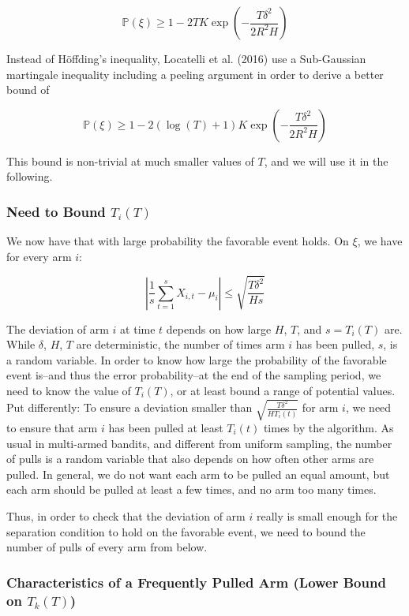 \documentclass[11pt,]{article}
\begin{document}
\[
\mathbb{P}(\xi) \geq 1 - 2TK \exp(-\frac{T\delta^2}{2R^2H})
\]

Instead of Höffding's inequality, Locatelli et al. (2016) use a
Sub-Gaussian martingale inequality including a peeling argument in order
to derive a better bound of

\[
\mathbb{P}(\xi) \geq 1 - 2(\log(T) +1)K \exp(-\frac{T\delta^2}{2R^2H})
\]

This bound is non-trivial at much smaller values of \(T\), and we will
use it in the following.

\subsubsection{\texorpdfstring{Need to Bound
\(T_i(T)\)}{Need to Bound T\_i(T)}}\label{need-to-bound-t_it}

We now have that with large probability the favorable event holds. On
\(\xi\), we have for every arm \(i\):

\[
|\frac{1}{s} \sum_{t=1}^{s}X_{i,t} - \mu_i| \leq \sqrt{\frac{T \delta^2}{H s}}
\]

The deviation of arm \(i\) at time \(t\) depends on how large \(H\),
\(T\), and \(s = T_i(T)\) are. While \(\delta\), \(H\), \(T\) are
deterministic, the number of times arm \(i\) has been pulled, \(s\), is
a random variable. In order to know how large the probability of the
favorable event is--and thus the error probability--at the end of the
sampling period, we need to know the value of \(T_i(T)\), or at least
bound a range of potential values. Put differently: To ensure a
deviation smaller than \(\sqrt{\frac{T\delta^2}{HT_i(t)}}\) for arm
\(i\), we need to ensure that arm \(i\) has been pulled at least
\(T_i(t)\) times by the algorithm. As usual in multi-armed bandits, and
different from uniform sampling, the number of pulls is a random
variable that also depends on how often other arms are pulled. In
general, we do not want each arm to be pulled an equal amount, but each
arm should be pulled at least a few times, and no arm too many times.

Thus, in order to check that the deviation of arm \(i\) really is small
enough for the separation condition to hold on the favorable event, we
need to bound the number of pulls of every arm from below.

\subsubsection{\texorpdfstring{Characteristics of a Frequently Pulled
Arm (Lower Bound on
\(T_k(T)\))}{Characteristics of a Frequently Pulled Arm (Lower Bound on T\_k(T))}}\label{characteristics-of-a-frequently-pulled-arm-lower-bound-on-t_kt}
\end{document}
